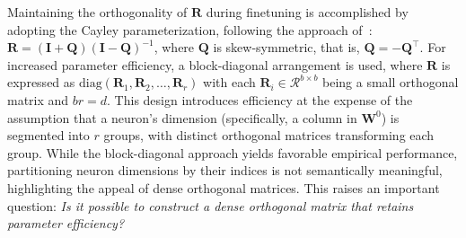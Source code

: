 Maintaining the orthogonality of $\bm{R}$ during finetuning is accomplished by adopting the Cayley parameterization, following the approach of~\cite{qiu2023controlling,liu2021orthogonal}: $\bm{R} = (\bm{I} + \bm{Q})(\bm{I} - \bm{Q})^{-1}$, where $\bm{Q}$ is skew-symmetric, that is, $\bm{Q} = -\bm{Q}^\top$. For increased parameter efficiency, a block-diagonal arrangement is used, where $\bm{R}$ is expressed as $\text{diag}(\bm{R}_1, \bm{R}_2, \ldots, \bm{R}_r)$ with each $\bm{R}_i \in \mathcal{R}^{b \times b}$ being a small orthogonal matrix and $br = d$. This design introduces efficiency at the expense of the assumption that a neuron's dimension (specifically, a column in $\bm{W}^0$) is segmented into $r$ groups, with distinct orthogonal matrices transforming each group. While the block-diagonal approach yields favorable empirical performance, partitioning neuron dimensions by their indices is not semantically meaningful, highlighting the appeal of dense orthogonal matrices. This raises an important question: \emph{Is it possible to construct a dense orthogonal matrix that retains parameter efficiency?}


